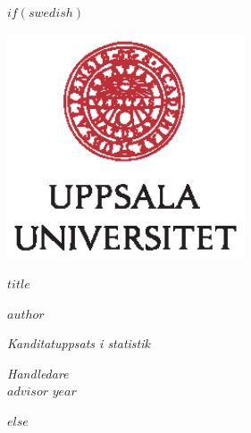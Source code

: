 \documentclass[a4paper,11pt]{article}
\renewcommand{\baselinestretch}{1.5}
\begin{document}
$if(swedish)$
\thispagestyle{empty}
\begin{center}
\includegraphics[width=7cm]{UU_logo_CMYK.eps}
\end{center}
\vspace{1.5cm}
\begin{center}
\begin{Large}
{\bf $title$} 
\end{Large}
\end{center}
\vskip1.5cm
\renewcommand{\baselinestretch}{1}
\begin{center}
{\large $author$} 
\vskip2.5cm
\begin{center}
\begin{large}
{\it Kanditatuppsats i statistik}\\
\end{large}
\end{center}
\vskip2cm
{\large\it Handledare}\\
{\large $advisor$} 
\vskip2cm
{\large $year$} 
\end{center}\vfill
$else$
\end{document}
